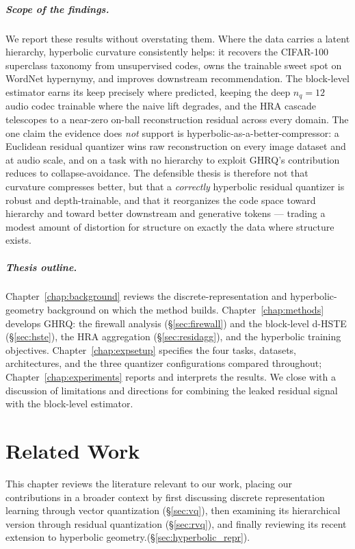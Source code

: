\documentclass[12pt]{report}
\begin{document}
\paragraph{Scope of the findings.} We report these results without overstating them. Where the data carries a latent hierarchy, hyperbolic curvature consistently helps: it recovers the CIFAR-100 superclass taxonomy from unsupervised codes, owns the trainable sweet spot on WordNet hypernymy, and improves downstream recommendation. The block-level estimator earns its keep precisely where predicted, keeping the deep $n_q\!=\!12$ audio codec trainable where the naive lift degrades, and the HRA cascade telescopes to a near-zero on-ball reconstruction residual across every domain. The one claim the evidence does \emph{not} support is hyperbolic-as-a-better-compressor: a Euclidean residual quantizer wins raw reconstruction on every image dataset and at audio scale, and on a task with no hierarchy to exploit GHRQ's contribution reduces to collapse-avoidance. The defensible thesis is therefore not that curvature compresses better, but that a \emph{correctly} hyperbolic residual quantizer is robust and depth-trainable, and that it reorganizes the code space toward hierarchy and toward better downstream and generative tokens --- trading a modest amount of distortion for structure on exactly the data where structure exists.

\paragraph{Thesis outline.} Chapter~\ref{chap:background} reviews the discrete-representation and hyperbolic-geometry background on which the method builds. Chapter~\ref{chap:methods} develops GHRQ: the firewall analysis (\S\ref{sec:firewall}) and the block-level d-HSTE (\S\ref{sec:hste}), the HRA aggregation (\S\ref{sec:residagg}), and the hyperbolic training objectives. Chapter~\ref{chap:expsetup} specifies the four tasks, datasets, architectures, and the three quantizer configurations compared throughout; Chapter~\ref{chap:experiments} reports and interprets the results. We close with a discussion of limitations and directions for combining the leaked residual signal with the block-level estimator.

\chapter{Related Work}

This chapter reviews the literature relevant to our work, placing our contributions in a broader context by first discussing discrete representation learning through vector quantization (\S\ref{sec:vq}), then examining its hierarchical version through residual quantization (\S\ref{sec:rvq}), and finally reviewing its recent extension to hyperbolic geometry.(\S\ref{sec:hyperbolic_repr}).
\end{document}
